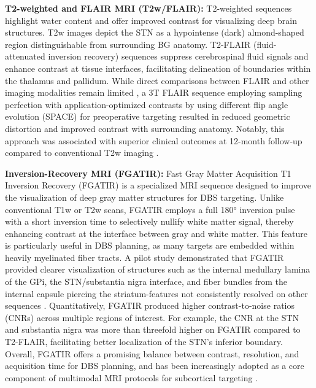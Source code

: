 \textbf{T2-weighted and FLAIR MRI (T2w/FLAIR):} T2-weighted sequences highlight water content and offer improved contrast for visualizing deep brain structures. T2w images depict the STN as a hypointense (dark) almond-shaped region distinguishable from surrounding BG anatomy. T2-FLAIR (fluid-attenuated inversion recovery) sequences suppress cerebrospinal fluid signals and enhance contrast at tissue interfaces, facilitating delineation of boundaries within the thalamus and pallidum. While direct comparisons between FLAIR and other imaging modalities remain limited \cite{Boutet2021-vg}, a 3T FLAIR sequence employing sampling perfection with application-optimized contrasts by using different flip angle evolution (SPACE) for preoperative targeting resulted in reduced geometric distortion and improved contrast with surrounding anatomy. Notably, this approach was associated with superior clinical outcomes at 12-month follow-up compared to conventional T2w imaging \cite{Senova2016-bh}.

\textbf{Inversion-Recovery MRI (FGATIR):}  
Fast Gray Matter Acquisition T1 Inversion Recovery (FGATIR) is a specialized MRI sequence designed to improve the visualization of deep gray matter structures for DBS targeting. Unlike conventional T1w or T2w scans, FGATIR employs a full 180° inversion pulse with a short inversion time to selectively nullify white matter signal, thereby enhancing contrast at the interface between gray and white matter. This feature is particularly useful in DBS planning, as many targets are embedded within heavily myelinated fiber tracts. A pilot study demonstrated that FGATIR provided clearer visualization of structures such as the internal medullary lamina of the GPi, the STN/substantia nigra interface, and fiber bundles from the internal capsule piercing the striatum-features not consistently resolved on other sequences \cite{Sudhyadhom2009-xx}. Quantitatively, FGATIR produced higher contrast-to-noise ratios (CNRs) across multiple regions of interest. For example, the CNR at the STN and substantia nigra was more than threefold higher on FGATIR compared to T2-FLAIR, facilitating better localization of the STN's inferior boundary. Overall, FGATIR offers a promising balance between contrast, resolution, and acquisition time for DBS planning, and has been increasingly adopted as a core component of multimodal MRI protocols for subcortical targeting \cite{Neudorfer2022-nj}.


